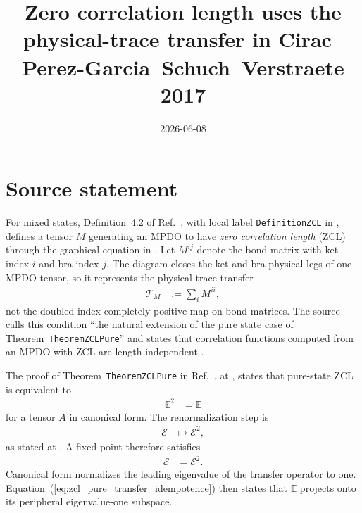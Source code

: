 \documentclass{article}
\title{Zero correlation length uses the physical-trace transfer in
Cirac--Perez-Garcia--Schuch--Verstraete 2017}
\author{}
\date{2026-06-08}
\begin{document}
\maketitle
{}

\section{Source statement}

For mixed states, Definition~4.2 of
Ref.~\cite{Cirac2016MPDO_arXiv}, with local label
\texttt{DefinitionZCL} in
, defines a tensor $M$
generating an MPDO to have \emph{zero correlation length} (ZCL) through the
graphical equation in . Let $M^{ij}$ denote the bond matrix
with ket index $i$ and bra index $j$. The diagram closes the ket and bra
physical legs of one MPDO tensor, so it represents the physical-trace transfer
\begin{align}
    \mathcal T_M
    &:=\sum_i M^{ii},
    \label{eq:zcl_physical_trace_transfer}
\end{align}
not the doubled-index completely positive map on bond matrices. The source
calls this condition ``the natural extension of the pure state case of
Theorem~\texttt{TheoremZCLPure}'' and states that correlation functions
computed from an MPDO with ZCL are length independent
\cite[lines~735--739]{Cirac2016MPDO_arXiv}.

The proof of Theorem~\texttt{TheoremZCLPure} in
Ref.~\cite{Cirac2016MPDO_arXiv}, at
, states that pure-state ZCL
is equivalent to
\begin{align}
    \mathbb E^2
    &=\mathbb E
    \label{eq:zcl_pure_transfer_idempotence}
\end{align}
for a tensor $A$ in canonical form. The renormalization step is
\begin{align}
    \mathcal E
    &\longmapsto\mathcal E^2,
    \label{eq:zcl_pure_renormalization_step}
\end{align}
as stated at
. A fixed point therefore
satisfies
\begin{align}
    \mathcal E
    &=\mathcal E^2.
    \label{eq:zcl_pure_fixed_point}
\end{align}
Canonical form normalizes the leading eigenvalue of the transfer operator to
one. Equation~(\ref{eq:zcl_pure_transfer_idempotence}) then states that
$\mathbb E$ projects onto its peripheral eigenvalue-one subspace.
\end{document}
